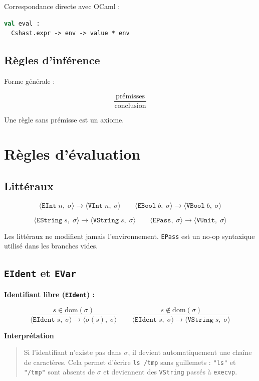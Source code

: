 \documentclass[11pt,a4paper]{article}
\newcommand{\sem}[4]{%
  \langle #1,\;#2\rangle \rightarrow \langle #3,\;#4\rangle}
\newcommand{\irule}[2]{%
  \dfrac{\displaystyle #1}{\displaystyle #2}
}
\newcommand{\dom}[1]{\mathrm{dom}(#1)}
\newcommand{\V}[1]{\mathtt{#1}}
\newenvironment{bloc}[1]
{
  \par\medskip
  \noindent\textbf{#1}
  \par
  \smallskip
  \begin{quote}
}
{
  \end{quote}
  \medskip
}
\begin{document}
Correspondance directe avec OCaml :

\begin{lstlisting}[language=ml]
val eval :
  Cshast.expr -> env -> value * env
\end{lstlisting}

\subsection{Règles d'inférence}

Forme générale :

\[
\irule{\text{prémisses}}{\text{conclusion}}
\]

Une règle sans prémisse est un axiome.

\section{Règles d'évaluation}

\subsection{Littéraux}

\[
\sem{\V{EInt}\;n}{\sigma}{\V{VInt}\;n}{\sigma}
\qquad
\sem{\V{EBool}\;b}{\sigma}{\V{VBool}\;b}{\sigma}
\]

\[
\sem{\V{EString}\;s}{\sigma}{\V{VString}\;s}{\sigma}
\qquad
\sem{\V{EPass}}{\sigma}{\V{VUnit}}{\sigma}
\]

Les littéraux ne modifient jamais l'environnement.
\texttt{EPass} est un no-op syntaxique utilisé dans les branches vides.

\subsection{\texttt{EIdent} et \texttt{EVar}}

\textbf{Identifiant libre (\texttt{EIdent}) :}

\[
\irule{
s \in \dom{\sigma}
}{
\sem{\V{EIdent}\;s}{\sigma}{\sigma(s)}{\sigma}
}
\qquad
\irule{
s \notin \dom{\sigma}
}{
\sem{\V{EIdent}\;s}{\sigma}{\V{VString}\;s}{\sigma}
}
\]

\begin{bloc}{Interprétation}
Si l'identifiant n'existe pas dans $\sigma$,
il devient automatiquement une chaîne de caractères.
Cela permet d'écrire \texttt{ls /tmp} sans guillemets :
\texttt{"ls"} et \texttt{"/tmp"} sont absents de $\sigma$
et deviennent des \texttt{VString} passés à \texttt{execvp}.
\end{bloc}
\end{document}

